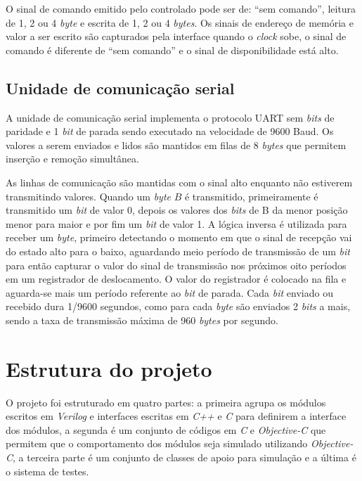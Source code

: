 O sinal de comando emitido pelo controlado pode ser de: ``sem comando'', leitura de 1, 2 ou 4 \emph{byte} e
escrita de 1, 2 ou 4 \emph{bytes}. Os sinais de endereço de memória e valor a ser escrito são capturados
pela interface quando o \emph{clock} sobe, o sinal de comando é diferente de ``sem comando'' e o sinal
de disponibilidade está alto.

\subsection{Unidade de comunicação serial}
\label{ssec:serial}

A unidade de comunicação serial implementa o protocolo UART sem \emph{bits} de paridade e 1 
\emph{bit} de parada sendo executado na velocidade de 9600 Baud. Os valores a serem
enviados e lidos são mantidos em filas de 8 \emph{bytes} que permitem inserção e remoção simultânea.

As linhas de comunicação são mantidas com o sinal alto enquanto não estiverem transmitindo valores.
Quando um \emph{byte} $B$ é transmitido, primeiramente é transmitido um \emph{bit} de valor 0, depois
os valores dos \emph{bits} de B da menor posição menor para maior e por fim um \emph{bit} de valor 1.
A lógica inversa é utilizada para receber um \emph{byte}, primeiro detectando o momento em que o 
sinal de recepção vai do estado alto para o baixo, aguardando meio período de transmissão de um \emph{bit} 
para então capturar
o valor do sinal de transmissão nos próximos oito períodos em um registrador de deslocamento. O valor
do registrador é colocado na fila e aguarda-se mais um período referente ao \emph{bit} de parada.
Cada \emph{bit} enviado ou recebido dura 1/9600 segundos, como para cada \emph{byte} são enviados
2 \emph{bits} a mais, sendo a taxa de transmissão máxima de 960 \emph{bytes} por segundo.

\section{Estrutura do projeto}
\label{sec:edp}

O projeto foi estruturado em quatro partes: a primeira agrupa os módulos escritos em \emph{Verilog}
e interfaces escritas em \emph{C++} e \emph{C} para definirem a interface dos módulos, a
segunda é um conjunto de códigos em \emph{C} e \emph{Objective-C} que permitem que
o comportamento dos módulos seja simulado utilizando \emph{Objective-C}, a terceira parte é um conjunto
de classes de apoio para simulação e a última é o sistema de testes.

